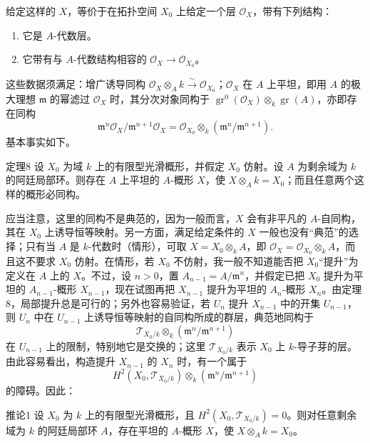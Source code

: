 给定这样的 $X$，等价于在拓扑空间 $X_0$ 上给定一个层 $\mathcal O_X$，带有下列结构：
\begin{enumerate}
\item[(i)] 它是 $A$-代数层。
\item[(ii)] 它带有与 $A$-代数结构相容的 $\mathcal O_X\to\mathcal O_{X_0}$。
\end{enumerate}
这些数据须满足：增广诱导同构 $\mathcal O_X\otimes_Ak\xrightarrow{\sim}\mathcal O_{X_0}$；$\mathcal O_X$ 在 $A$ 上平坦，即用 $A$ 的极大理想 $\mathfrak m$ 的幂滤过 $\mathcal O_X$ 时，其分次对象同构于 $\operatorname{gr}^0(\mathcal O_X)\otimes_k\operatorname{gr}(A)$，亦即存在同构
\[
\mathfrak m^n\mathcal O_X/\mathfrak m^{n+1}\mathcal O_X
=\mathcal O_{X_0}\otimes_k(\mathfrak m^n/\mathfrak m^{n+1}).
\]
基本事实如下。
\begin{statement}{定理8}
设 $X_0$ 为域 $k$ 上的有限型光滑概形，并假定 $X_0$ 仿射。设 $A$ 为剩余域为 $k$ 的阿廷局部环。则存在 $A$ 上平坦的 $A$-概形 $X$，使 $X\otimes_Ak=X_0$；而且任意两个这样的概形必同构。
\end{statement}
应当注意，这里的同构不是典范的，因为一般而言，$X$ 会有非平凡的 $A$-自同构，其在 $X_0$ 上诱导恒等映射。另一方面，满足给定条件的 $X$ 一般也没有“典范”的选择；只有当 $A$ 是 $k$-代数时（情形），可取 $X=X_0\otimes_k A$，即 $\mathcal O_X=\mathcal O_{X_0}\otimes_k A$，而且这不要求 $X_0$ 仿射。在情形，若 $X_0$ 不仿射，我一般不知道能否把 $X_0$“提升”为定义在 $A$ 上的 $X$。不过，设 $n>0$，置 $A_{n-1}=A/\mathfrak m^n$，并假定已把 $X_0$ 提升为平坦的 $A_{n-1}$-概形 $X_{n-1}$，现在试图再把 $X_{n-1}$ 提升为平坦的 $A_n$-概形 $X_n$。由定理8，局部提升总是可行的；另外也容易验证，若 $U_n$ 提升 $X_{n-1}$ 中的开集 $U_{n-1}$，则 $U_n$ 中在 $U_{n-1}$ 上诱导恒等映射的自同构所成的群层，典范地同构于
\[
\mathcal T_{X_0/k}\otimes_k(\mathfrak m^n/\mathfrak m^{n+1})
\]
在 $U_{n-1}$ 上的限制，特别地它是交换的；这里 $\mathcal T_{X_0/k}$ 表示 $X_0$ 上 $k$-导子芽的层。由此容易看出，构造提升 $X_{n-1}$ 的 $X_n$ 时，有一个属于
\[
H^2(X_0,\mathcal T_{X_0/k})\otimes_k(\mathfrak m^n/\mathfrak m^{n+1})
\]
的障碍。因此：
\begin{statement}{推论1}
设 $X_0$ 为 $k$ 上的有限型光滑概形，且 $H^2(X_0,\mathcal T_{X_0/k})=0$。则对任意剩余域为 $k$ 的阿廷局部环 $A$，存在平坦的 $A$-概形 $X$，使 $X\otimes_Ak=X_0$。
\end{statement}

